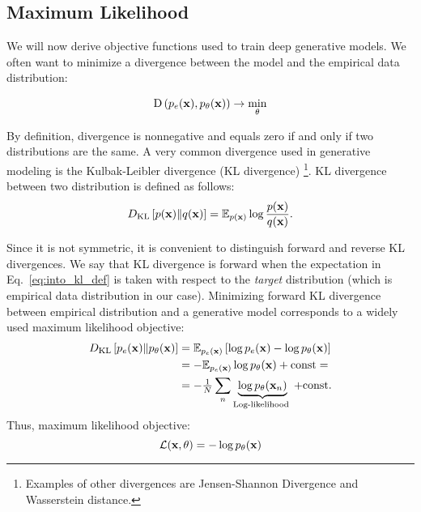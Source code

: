 \subsection{Maximum Likelihood}
We will now derive objective functions used to train deep generative models. We often want to minimize a divergence between the model and the empirical data distribution:

\begin{equation}\label{eq:intro_divergence}
\begin{aligned}
\text{D}\left(p_{e}(\rvx), p_{\theta}(\rvx)\right) \rightarrow \min_{\theta}
\end{aligned}
\end{equation} 

By definition, divergence is nonnegative and equals zero if and only if two distributions are the same. 
A very common divergence used in generative modeling is the Kulbak-Leibler divergence (KL divergence) \footnote{Examples of other divergences are Jensen-Shannon Divergence and Wasserstein distance.}. KL divergence between two distribution is defined as follows:
\begin{equation}
\begin{aligned} \label{eq:into_kl_def}
 \KL{p(\rvx)}{q(\rvx)} = \E_{p(\rvx)} \log \frac{p(\rvx)}{q(\rvx)}.
\end{aligned}
\end{equation}

Since it is not symmetric, it is convenient to distinguish forward and reverse KL divergences. We say that KL divergence is forward when the expectation in Eq.~\ref{eq:into_kl_def} is taken with respect to the \textit{target} distribution (which is empirical data distribution in our case). Minimizing forward KL divergence between empirical distribution and a generative model corresponds to a widely used maximum likelihood objective:
\begin{equation}
\begin{aligned}
D_{\mathrm{KL}}\left[p_{e}({\mathbf{x}})\|p_{\theta}({\mathbf{x}})\right] & =  \mathbb{E}_{p_{e}({\mathbf{x}})}\left[ \log p_{e}({\mathbf{x}}) - \log p_{\theta}({\mathbf{x}})\right] \\
& =  - \mathbb{E}_{p_{e}({\mathbf{x}})} \log p_{\theta}({\mathbf{x}}) + \text{const}=\\
& =  - \tfrac1N \sum_n \underbrace{\log p_{\theta}({\mathbf{x}}_n)}_{\text{Log-likelihood }}  + \text{const}.
\end{aligned}
\end{equation}
Thus, maximum likelihood objective:
\begin{equation}
    \mathcal{L}({\mathbf{x}}, \theta) = -\log p_{\theta}({\mathbf{x}})
\end{equation}

